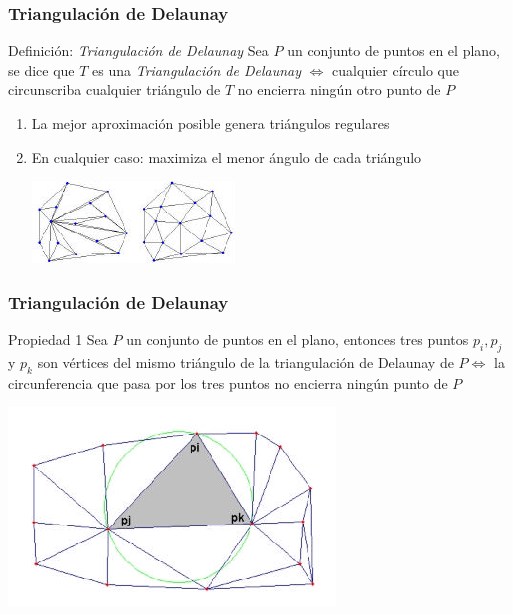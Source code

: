 \begin{frame}
  \frametitle{Triangulación de Delaunay}
  \begin{beamerboxesrounded}[shadow=true]{Definición: \emph{Triangulación de
    Delaunay}}
    Sea $P$ un conjunto de puntos en el \alert{plano}, se dice que $T$ es una
    \alert{\emph{Triangulación de Delaunay}} $\Leftrightarrow$ cualquier círculo que
    circunscriba cualquier triángulo de $T$ no encierra ningún otro punto de $P$
    \end{beamerboxesrounded}
  \begin{enumerate}
    \item La mejor aproximación posible genera triángulos regulares
    \item En cualquier caso: maximiza el menor ángulo de cada triángulo
  \begin{center}
        \includegraphics[height=0.15\textwidth]{images/triang_regular}
  \end{center}
  \end{enumerate}
\end{frame}
\begin{frame}
  \frametitle{Triangulación de Delaunay}
  \begin{beamerboxesrounded}[shadow=true]{Propiedad 1}
    Sea $P$ un conjunto de puntos en el plano, entonces tres puntos $p_i, p_j$ y
    $p_k$ son vértices del mismo triángulo de la triangulación de Delaunay de $P
    \Leftrightarrow$ la circunferencia que pasa por los tres puntos no encierra
    ningún punto de $P$
  \end{beamerboxesrounded}
  \begin{center}
  \includegraphics[height=0.20\textwidth]{images/propiedad1}
  \end{center}
\end{frame}
